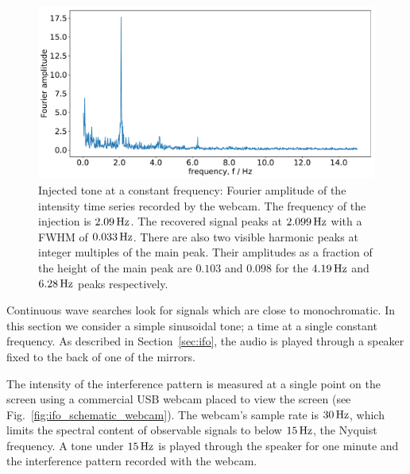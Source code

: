 \documentclass[paper-main.tex]{subfiles}
\begin{document}


\begin{figure}
	\includegraphics[width=.49\textwidth]{figures/webcam_expt_4_0209-cropped.pdf}
	\caption{\label{fig:webcam_spectrum}
Injected tone at a constant frequency: Fourier amplitude of the intensity time series recorded by the webcam. 
The frequency of the injection is $2.09\,{\rm Hz}$. 
The recovered signal peaks at $2.099\,{\rm Hz}$ with a FWHM of $0.033\,{\rm Hz}$. 
There are also two visible harmonic peaks at integer multiples of the main peak. 
Their amplitudes as a fraction of the height of the main peak are  $0.103$ and $0.098$ for the $4.19\,{\rm Hz}$ and $6.28\,{\rm Hz}$ peaks respectively. 
}
	
\end{figure}


Continuous wave searches look for signals which are close to monochromatic. 
In this section we consider a simple sinusoidal tone; a time at a single constant frequency. 
As described in Section~\ref{sec:ifo}, the audio is played through a speaker fixed to the back of one of the mirrors.


The intensity of the interference pattern is measured at a single point on the screen using a commercial USB webcam placed to view the screen (see Fig.~\ref{fig:ifo_schematic_webcam}). 
The webcam's sample rate is $30\,{\rm Hz}$, which limits the spectral content of observable signals to below $15\,{\rm Hz}$, the Nyquist frequency.
A tone under $15\,{\rm Hz}$ is played through the speaker for one minute and the interference pattern recorded with the webcam. 
\end{document}
